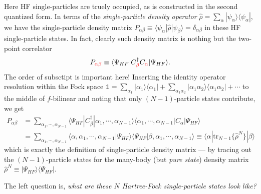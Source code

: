 \documentclass[aps,prb,nofootinbib,reprint,onecolumn]{revtex4-2}
\begin{document}
	Here HF single-particles are truely occupied, as is constructed in the second quantized form. In terms of the \emph{single-particle density operator} $\hat \rho=\sum_\alpha |\psi_\alpha\rangle\langle\psi_\alpha|$, we have the single-particle density matrix $P_{\alpha\beta}\equiv\langle\psi_\alpha|\hat \rho|\psi_\beta\rangle=\delta_{\alpha\beta}$ in these HF single-particle states. In fact, clearly such density matrix is nothing but the two-point correlator
	\begin{align*}
		P_{{\color{red}\alpha\beta}}\equiv\langle\Psi_{HF}|C_{{\color{red}\beta}}^\dagger C_{\color{red}\alpha}|\Psi_{HF}\rangle.
	\end{align*}
	The order of subsctipt is important here! Inserting the identity operator resolution within the Fock space $\mathds1=\sum_{\alpha_1}|\alpha_1\rangle\langle\alpha_1|+\sum_{\alpha_1\alpha_2}|\alpha_1\alpha_2\rangle\langle\alpha_1\alpha_2|+\cdots$ to the middle of $f$-bilinear and noting that only $(N-1)$-particle states contribute, we get
	\begin{align*}
		P_{\alpha\beta}&=\sum_{\alpha_1,\cdots,\alpha_{N-1}}\langle\Psi_{HF}|C_\beta^\dagger|\alpha_1,\cdots,\alpha_{N-1}\rangle\langle \alpha_1,\cdots,\alpha_{N-1}|C_\alpha|\Psi_{HF}\rangle\\
		&=\sum_{\alpha_1,\cdots,\alpha_{N-1}}\langle\alpha,\alpha_1,\cdots,\alpha_{N-1}|\Psi_{HF}\rangle\langle\Psi_{HF}|\beta,\alpha_1,\cdots,\alpha_{N-1}\rangle\equiv\langle\alpha|\mathrm{tr}_{N-1}\{\hat\rho^N\}|\beta\rangle
	\end{align*}
	which is exactly the definition of single-particle density matrix --- by tracing out the $(N-1)$-particle states for the many-body (but \emph{pure state}) density matrix $\hat\rho^N\equiv|\Psi_{HF}\rangle\langle\Psi_{HF}|$.

	The left question is, \emph{what are these $N$ Hartree-Fock single-particle states look like?}
\end{document}
